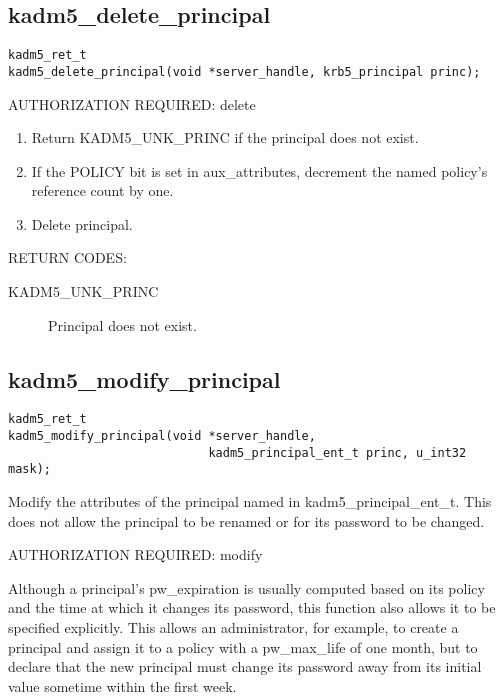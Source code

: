 \subsection{kadm5_delete_principal}

\begin{verbatim}
kadm5_ret_t
kadm5_delete_principal(void *server_handle, krb5_principal princ);
\end{verbatim}

AUTHORIZATION REQUIRED: delete 

\begin{enumerate}
\item Return KADM5_UNK_PRINC if the principal does not exist.
\item If the POLICY bit is set in aux_attributes, decrement the named
policy's reference count by one.
\item Delete principal.
\end{enumerate}

RETURN CODES: 

\begin{description}
\item[KADM5_UNK_PRINC] Principal does not exist.
\end{description}

\subsection{kadm5_modify_principal}

\begin{verbatim}
kadm5_ret_t
kadm5_modify_principal(void *server_handle,
                            kadm5_principal_ent_t princ, u_int32 mask);
\end{verbatim}

Modify the attributes of the principal named in
kadm5_principal_ent_t. This does not allow the principal to be
renamed or for its password to be changed.

AUTHORIZATION REQUIRED: modify

Although a principal's pw_expiration is usually computed based on its
policy and the time at which it changes its password, this function
also allows it to be specified explicitly.  This allows an
administrator, for example, to create a principal and assign it to a
policy with a pw_max_life of one month, but to declare that the new
principal must change its password away from its initial value
sometime within the first week.

